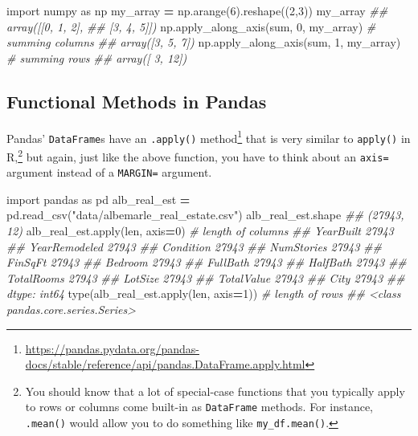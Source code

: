 \documentclass[
  12pt,
  krantz2]{krantz}
\makeatletter
\newenvironment{Shaded}{\begin{snugshade}}{\end{snugshade}}
\newcommand{\BuiltInTok}[1]{#1}
\newcommand{\CommentTok}[1]{\textcolor[rgb]{0.37,0.37,0.37}{\textit{#1}}}
\newcommand{\DecValTok}[1]{\textcolor[rgb]{0.06,0.06,0.06}{#1}}
\newcommand{\ImportTok}[1]{#1}
\newcommand{\NormalTok}[1]{#1}
\newcommand{\OperatorTok}[1]{\textcolor[rgb]{0.43,0.43,0.43}{\textbf{#1}}}
\newcommand{\StringTok}[1]{\textcolor[rgb]{0.5,0.5,0.5}{#1}}
\renewcommand{\href}[2]{#2\footnote{\url{#1}}}
\newenvironment{kframe}{%
\medskip{}
\setlength{\fboxsep}{.8em}
 \def\at@end@of@kframe{}%
 \ifinner\ifhmode%
  \def\at@end@of@kframe{\end{minipage}}%
  \begin{minipage}{\columnwidth}%
 \fi\fi%
 \def\FrameCommand##1{\hskip\@totalleftmargin \hskip-\fboxsep
 \colorbox{shadecolor}{##1}\hskip-\fboxsep
     \hskip-\linewidth \hskip-\@totalleftmargin \hskip\columnwidth}%
 \MakeFramed {\advance\hsize-\width
   \@totalleftmargin\z@ \linewidth\hsize
   \@setminipage}}%
 {\par\unskip\endMakeFramed%
 \at@end@of@kframe}
\renewenvironment{Shaded}{\begin{kframe}}{\end{kframe}}
\makeatother
\begin{document}
\begin{Shaded}
\begin{Highlighting}[]
\ImportTok{import}\NormalTok{ numpy }\ImportTok{as}\NormalTok{ np}
\NormalTok{my\_array }\OperatorTok{=}\NormalTok{ np.arange(}\DecValTok{6}\NormalTok{).reshape((}\DecValTok{2}\NormalTok{,}\DecValTok{3}\NormalTok{))}
\NormalTok{my\_array}
\CommentTok{\#\# array([[0, 1, 2],}
\CommentTok{\#\#        [3, 4, 5]])}
\NormalTok{np.apply\_along\_axis(}\BuiltInTok{sum}\NormalTok{, }\DecValTok{0}\NormalTok{, my\_array) }\CommentTok{\# summing columns}
\CommentTok{\#\# array([3, 5, 7])}
\NormalTok{np.apply\_along\_axis(}\BuiltInTok{sum}\NormalTok{, }\DecValTok{1}\NormalTok{, my\_array) }\CommentTok{\# summing rows}
\CommentTok{\#\# array([ 3, 12])}
\end{Highlighting}
\end{Shaded}

\hypertarget{functional-methods-in-pandas}{%
\subsection{Functional Methods in Pandas}\label{functional-methods-in-pandas}}

Pandas' \texttt{DataFrame}s have an \href{https://pandas.pydata.org/pandas-docs/stable/reference/api/pandas.DataFrame.apply.html}{\texttt{.apply()} method} that is very similar to \texttt{apply()} in R,\footnote{You should know that a lot of special-case functions that you typically apply to rows or columns come built-in as \texttt{DataFrame} methods. For instance, \texttt{.mean()} would allow you to do something like \texttt{my\_df.mean()}.} but again, just like the above function, you have to think about an \texttt{axis=} argument instead of a \texttt{MARGIN=} argument.

\begin{Shaded}
\begin{Highlighting}[]
\ImportTok{import}\NormalTok{ pandas }\ImportTok{as}\NormalTok{ pd}
\NormalTok{alb\_real\_est }\OperatorTok{=}\NormalTok{ pd.read\_csv(}\StringTok{"data/albemarle\_real\_estate.csv"}\NormalTok{)}
\NormalTok{alb\_real\_est.shape}
\CommentTok{\#\# (27943, 12)}
\NormalTok{alb\_real\_est.}\BuiltInTok{apply}\NormalTok{(}\BuiltInTok{len}\NormalTok{, axis}\OperatorTok{=}\DecValTok{0}\NormalTok{) }\CommentTok{\# length of columns}
\CommentTok{\#\# YearBuilt        27943}
\CommentTok{\#\# YearRemodeled    27943}
\CommentTok{\#\# Condition        27943}
\CommentTok{\#\# NumStories       27943}
\CommentTok{\#\# FinSqFt          27943}
\CommentTok{\#\# Bedroom          27943}
\CommentTok{\#\# FullBath         27943}
\CommentTok{\#\# HalfBath         27943}
\CommentTok{\#\# TotalRooms       27943}
\CommentTok{\#\# LotSize          27943}
\CommentTok{\#\# TotalValue       27943}
\CommentTok{\#\# City             27943}
\CommentTok{\#\# dtype: int64}
\BuiltInTok{type}\NormalTok{(alb\_real\_est.}\BuiltInTok{apply}\NormalTok{(}\BuiltInTok{len}\NormalTok{, axis}\OperatorTok{=}\DecValTok{1}\NormalTok{)) }\CommentTok{\# length of rows}
\CommentTok{\#\# \textless{}class \textquotesingle{}pandas.core.series.Series\textquotesingle{}\textgreater{}}
\end{Highlighting}
\end{Shaded}
\end{document}
